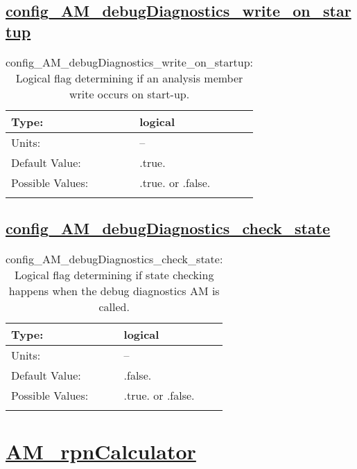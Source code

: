 \subsection[config\_AM\_debugDiagnostics\_write\_on\_startup]{\hyperref[sec:nm_tab_AM_debugDiagnostics]{config\_AM\_debugDiagnostics\_write\_on\_startup}}
\label{subsec:nm_sec_config_AM_debugDiagnostics_write_on_startup}
\begin{center}
\begin{longtable}{| p{2.0in} || p{4.0in} |}
    \hline
    Type: & logical \\
    \hline
    Units: & -- \\
    \hline
    Default Value: & .true. \\
    \hline
    Possible Values: & .true. or .false. \\
    \hline
    \caption{config\_AM\_debugDiagnostics\_write\_on\_startup: Logical flag determining if an analysis member write occurs on start-up.}
\end{longtable}
\end{center}
\subsection[config\_AM\_debugDiagnostics\_check\_state]{\hyperref[sec:nm_tab_AM_debugDiagnostics]{config\_AM\_debugDiagnostics\_check\_state}}
\label{subsec:nm_sec_config_AM_debugDiagnostics_check_state}
\begin{center}
\begin{longtable}{| p{2.0in} || p{4.0in} |}
    \hline
    Type: & logical \\
    \hline
    Units: & -- \\
    \hline
    Default Value: & .false. \\
    \hline
    Possible Values: & .true. or .false. \\
    \hline
    \caption{config\_AM\_debugDiagnostics\_check\_state: Logical flag determining if state checking happens when the debug diagnostics AM is called.}
\end{longtable}
\end{center}
\section[AM\_rpnCalculator]{\hyperref[sec:nm_tab_AM_rpnCalculator]{AM\_rpnCalculator}}
\label{sec:nm_sec_AM_rpnCalculator}

